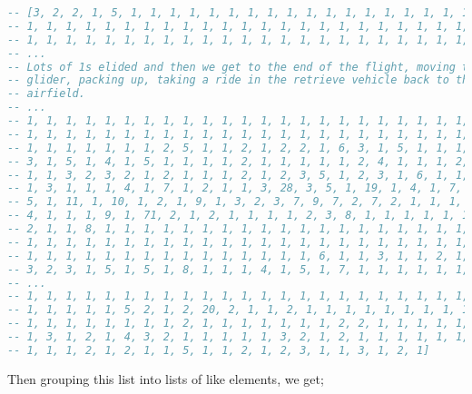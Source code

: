 \documentclass[gap.tex]{subfiles}
\begin{document}
\begin{lstlisting}[language=Haskell, caption={Runs of fixes close together.}]
-- [3, 2, 2, 1, 5, 1, 1, 1, 1, 1, 1, 1, 1, 1, 1, 1, 1, 1, 1, 1, 1, 1, 1, 1, 1,
-- 1, 1, 1, 1, 1, 1, 1, 1, 1, 1, 1, 1, 1, 1, 1, 1, 1, 1, 1, 1, 1, 1, 1, 1, 1,
-- 1, 1, 1, 1, 1, 1, 1, 1, 1, 1, 1, 1, 1, 1, 1, 1, 1, 1, 1, 1, 1, 1, 1, 1, 1,
-- ...
-- Lots of 1s elided and then we get to the end of the flight, moving the
-- glider, packing up, taking a ride in the retrieve vehicle back to the
-- airfield.
-- ...
-- 1, 1, 1, 1, 1, 1, 1, 1, 1, 1, 1, 1, 1, 1, 1, 1, 1, 1, 1, 1, 1, 1, 1, 1, 1,
-- 1, 1, 1, 1, 1, 1, 1, 1, 1, 1, 1, 1, 1, 1, 1, 1, 1, 1, 1, 1, 1, 1, 1, 1, 1,
-- 1, 1, 1, 1, 1, 1, 1, 2, 5, 1, 1, 2, 1, 2, 2, 1, 6, 3, 1, 5, 1, 1, 1, 4, 4,
-- 3, 1, 5, 1, 4, 1, 5, 1, 1, 1, 1, 2, 1, 1, 1, 1, 1, 2, 4, 1, 1, 1, 2, 1, 3,
-- 1, 1, 3, 2, 3, 2, 1, 2, 1, 1, 1, 2, 1, 2, 3, 5, 1, 2, 3, 1, 6, 1, 1, 1, 5,
-- 1, 3, 1, 1, 1, 4, 1, 7, 1, 2, 1, 1, 3, 28, 3, 5, 1, 19, 1, 4, 1, 7, 1, 3, 1,
-- 5, 1, 11, 1, 10, 1, 2, 1, 9, 1, 3, 2, 3, 7, 9, 7, 2, 7, 2, 1, 1, 1, 1, 5, 1,
-- 4, 1, 1, 1, 9, 1, 71, 2, 1, 2, 1, 1, 1, 1, 2, 3, 8, 1, 1, 1, 1, 1, 1, 1, 13,
-- 2, 1, 1, 8, 1, 1, 1, 1, 1, 1, 1, 1, 1, 1, 1, 1, 1, 1, 1, 1, 1, 1, 1, 1, 1,
-- 1, 1, 1, 1, 1, 1, 1, 1, 1, 1, 1, 1, 1, 1, 1, 1, 1, 1, 1, 1, 1, 1, 1, 1, 1,
-- 1, 1, 1, 1, 1, 1, 1, 1, 1, 1, 1, 1, 1, 1, 1, 6, 1, 1, 3, 1, 1, 2, 1, 4, 1,
-- 3, 2, 3, 1, 5, 1, 5, 1, 8, 1, 1, 1, 4, 1, 5, 1, 7, 1, 1, 1, 1, 1, 1, 1, 1,
-- ...
-- 1, 1, 1, 1, 1, 1, 1, 1, 1, 1, 1, 1, 1, 1, 1, 1, 1, 1, 1, 1, 1, 1, 1, 1, 2,
-- 1, 1, 1, 1, 1, 5, 2, 1, 2, 20, 2, 1, 1, 2, 1, 1, 1, 1, 1, 1, 1, 1, 1, 1, 1,
-- 1, 1, 1, 1, 1, 1, 1, 1, 2, 1, 1, 1, 1, 1, 1, 1, 2, 2, 1, 1, 1, 1, 1, 1, 2,
-- 1, 3, 1, 2, 1, 4, 3, 2, 1, 1, 1, 1, 1, 3, 2, 1, 2, 1, 1, 1, 1, 1, 1, 5, 1,
-- 1, 1, 1, 2, 1, 2, 1, 1, 5, 1, 1, 2, 1, 2, 3, 1, 1, 3, 1, 2, 1]
\end{lstlisting}

Then grouping this list into lists of like elements, we get;
\end{document}
